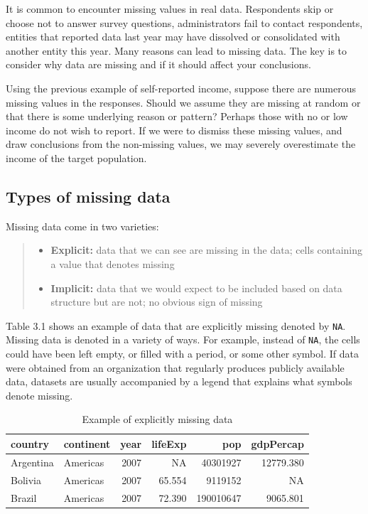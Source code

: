 \documentclass[
]{book}
\providecommand{\tightlist}{%
  \setlength{\itemsep}{0pt}\setlength{\parskip}{0pt}}
\begin{document}
It is common to encounter missing values in real data. Respondents skip or choose not to answer survey questions, administrators fail to contact respondents, entities that reported data last year may have dissolved or consolidated with another entity this year. Many reasons can lead to missing data. The key is to consider why data are missing and if it should affect your conclusions.

Using the previous example of self-reported income, suppose there are numerous missing values in the responses. Should we assume they are missing at random or that there is some underlying reason or pattern? Perhaps those with no or low income do not wish to report. If we were to dismiss these missing values, and draw conclusions from the non-missing values, we may severely overestimate the income of the target population.

\hypertarget{types-of-missing-data}{%
\subsection{Types of missing data}\label{types-of-missing-data}}

Missing data come in two varieties:

\begin{quote}
\begin{itemize}
\tightlist
\item
  \textbf{Explicit:} data that we can see are missing in the data; cells containing a value that denotes missing
\item
  \textbf{Implicit:} data that we would expect to be included based on data structure but are not; no obvious sign of missing
\end{itemize}
\end{quote}

Table 3.1 shows an example of data that are explicitly missing denoted by \texttt{NA}. Missing data is denoted in a variety of ways. For example, instead of \texttt{NA}, the cells could have been left empty, or filled with a period, or some other symbol. If data were obtained from an organization that regularly produces publicly available data, datasets are usually accompanied by a legend that explains what symbols denote missing.

\begin{table}

\caption{\label{tab:unnamed-chunk-1}Example of explicitly missing data}
\centering
\begin{tabular}[t]{l|l|r|r|r|r}
\hline
country & continent & year & lifeExp & pop & gdpPercap\\
\hline
Argentina & Americas & 2007 & NA & 40301927 & 12779.380\\
\hline
Bolivia & Americas & 2007 & 65.554 & 9119152 & NA\\
\hline
Brazil & Americas & 2007 & 72.390 & 190010647 & 9065.801\\
\hline
\end{tabular}
\end{table}
\end{document}

